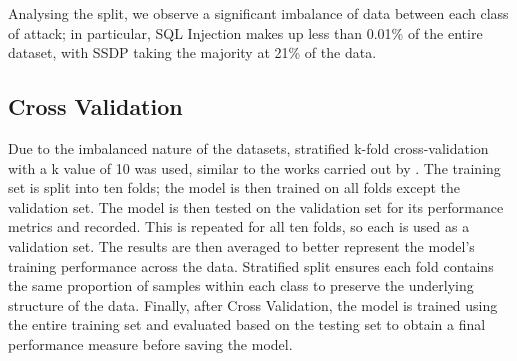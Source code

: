 Analysing the split, we observe a significant imbalance of data between each class of attack; in particular, SQL Injection makes up less than 0.01\% of the entire dataset, with SSDP taking the majority at 21\% of the data. 


\subsection{Cross Validation}

Due to the imbalanced nature of the datasets, stratified k-fold cross-validation with a k value of 10 was used, similar to the works carried out by \textcite{s22155633}. The training set is split into ten folds; the model is then trained on all folds except the validation set. The model is then tested on the validation set for its performance metrics and recorded. This is repeated for all ten folds, so each is used as a validation set. The results are then averaged to better represent the model's training performance across the data. Stratified split ensures each fold contains the same proportion of samples within each class to preserve the underlying structure of the data. Finally, after Cross Validation, the model is trained using the entire training set and evaluated based on the testing set to obtain a final performance measure before saving the model.